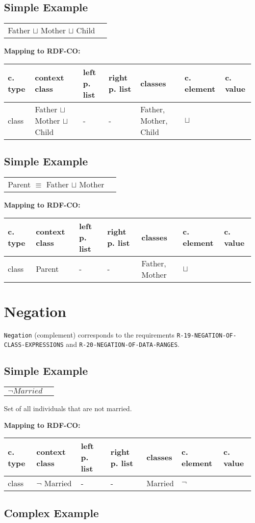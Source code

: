 \documentclass{llncs}
\newcommand{\ms}[1]{\texttt{#1}}
\newenvironment{gcotable}{
  \scriptsize
  \sffamily
  \vspace{0cm}
	\begin{center}
	\textbf{\vspace{0.4cm}Mapping to RDF-CO:} \\
  \begin{tabular}{l|l|l|l|l|l|l}
	\hline
  \textbf{c. type} & \textbf{context class} & \textbf{left p. list} & \textbf{right p. list} & \textbf{classes} & \textbf{c. element} & \textbf{c. value} \\
  \hline

}{
  \hline
  \end{tabular}
	\end{center}
}
\newenvironment{DL}{
  \vspace{0cm}
	\begin{center}
  \begin{tabular}{r l}

}{
  \end{tabular}
	\end{center}
}
\begin{document}
\subsection{Simple Example}

\begin{DL}
Father $\sqcup$ Mother $\sqcup$ Child
\end{DL}

\begin{gcotable}
class & Father $\sqcup$ Mother $\sqcup$ Child & - & - & Father, Mother, Child & $\sqcup$ \\
\end{gcotable}

\subsection{Simple Example}

\begin{DL}
Parent $\equiv$ Father $\sqcup$ Mother
\end{DL}

\begin{gcotable}
class & Parent & - & - & Father, Mother & $\sqcup$ \\
\end{gcotable}

\section{Negation}

\ms{Negation} (complement) corresponds to the requirements \ms{R-19-NEGATION-OF-} \ms{CLASS-EXPRESSIONS} and \ms{R-20-NEGATION-OF-DATA-RANGES}.

\subsection{Simple Example}

\begin{DL}
$ \neg Married $ \\ 
\end{DL}

Set of all individuals that are not married.

\begin{gcotable}
class & $\neg$ Married & - & - & Married & $\neg$ \\
\end{gcotable}

\subsection{Complex Example}
\end{document}
